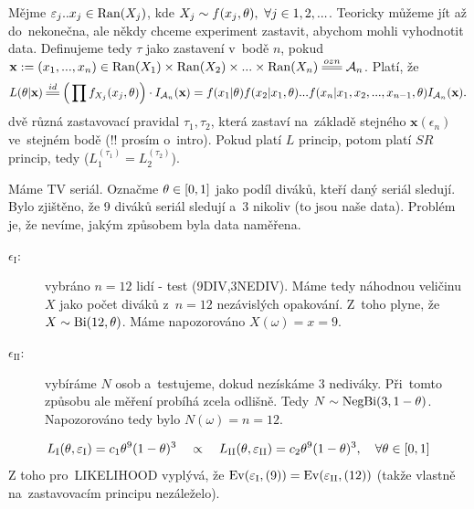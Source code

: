 \begin{example}
	Mějme $\varepsilon_j..x_j\in\mathop{\mathrm{Ran}}(X_j)$, kde $X_j\sim f(x_j,\theta),~\forall j\in 1,2,...$. Teoricky můžeme jít až do~nekonečna, ale někdy chceme experiment zastavit, abychom mohli vyhodnotit data. Definujeme tedy $\tau$ jako zastavení v~bodě $n$, pokud $\textbf{x}:=(x_1,...,x_n)\in\Ran(X_1)\times\Ran(X_2)\times...\times\Ran(X_n)\equal{ozn}\Aa_n$. Platí, že
	$$ L(\t|\textbf{x})\equal{id}\Big(\prod f_{X_j}(x_j,\t) \Big)\cdot I_{\Aa_n}(\textbf{x})=f(x_1|\t)f(x_2|x_1,\t)...f(x_n|x_1,x_2,...,x_{n-1},\t)I_{\Aa_n}(\textbf{x}).$$
	dvě různá zastavovací pravidal $\tau_1,\tau_2$, která zastaví na~základě stejného $\textbf{x}(\epsilon_n)$ ve~stejném bodě (!! prosím o~intro). Pokud platí $L$ princip, potom platí $SR$ princip, tedy ($L_1^{(\tau_1)}=L_2^{(\tau_2)}$).
\end{example}
\begin{example}
	Máme TV seriál. Označme $\theta\in[0,1]$ jako podíl diváků, kteří daný seriál sledují. Bylo zjištěno, že 9 diváků seriál sledují a~3 nikoliv (to jsou naše data). Problém je, že nevíme, jakým způsobem byla data naměřena. 
	\begin{description}
		\item[$\epsilon_\mathrm{I}:$] vybráno $n=12$ lidí - test (9DIV,3NEDIV). Máme tedy náhodnou veličinu $X$ jako počet diváků z~$n=12$ nezávislých opakování. Z~toho plyne, že $X\sim \mathrm{Bi}(12,\theta)$. Máme napozorováno $X(\omega)=x=9$.
		\item[$\epsilon_\mathrm{II}:$] vybíráme $N$ osob a~testujeme, dokud nezískáme $3$ nediváky. Při~tomto způsobu ale měření probíhá zcela odlišně. Tedy $N\sim\mathrm{NegBi}(3,1-\theta)$. Napozorováno tedy bylo $N(\omega)=n=12$.
	\end{description}
$$ L_\mathrm{I}(\theta,\varepsilon_\mathrm{I})=c_1\theta^9(1-\theta)^3\quad\propto\quad L_\mathrm{II}(\theta,\varepsilon_\mathrm{II})=c_2\theta^9(1-\theta)^3,\quad \forall\theta\in[0,1] $$
Z toho pro~LIKELIHOOD vyplývá, že $\mathrm{Ev}(\varepsilon_\mathrm{I},(9))=\mathrm{Ev}(\varepsilon_\mathrm{II},(12))$ (takže vlastně na~zastavovacím principu nezáleželo).
\end{example}

